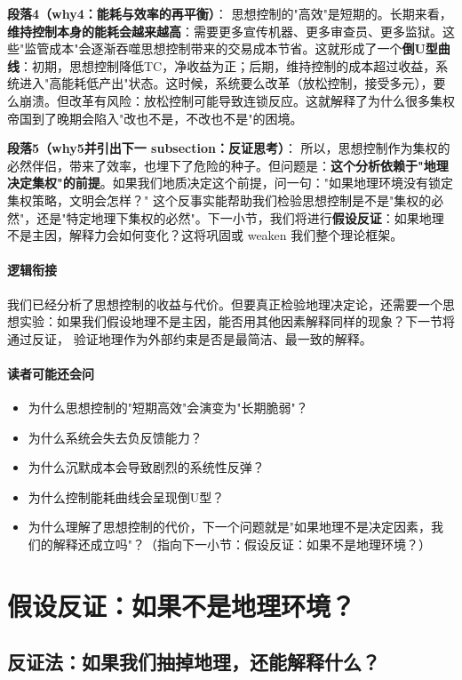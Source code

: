 \documentclass[../main.tex]{subfiles}
\begin{document}
	\textbf{段落4（why4：能耗与效率的再平衡）}：  
	思想控制的"高效"是短期的。长期来看，\textbf{维持控制本身的能耗会越来越高}：需要更多宣传机器、更多审查员、更多监狱。这些"监管成本"会逐渐吞噬思想控制带来的交易成本节省。这就形成了一个\textbf{倒U型曲线}：初期，思想控制降低TC，净收益为正；后期，维持控制的成本超过收益，系统进入"高能耗低产出"状态。这时候，系统要么改革（放松控制，接受多元），要么崩溃。但改革有风险：放松控制可能导致连锁反应。这就解释了为什么很多集权帝国到了晚期会陷入"改也不是，不改也不是"的困境。
	
	\textbf{段落5（why5并引出下一 subsection：反证思考）}：  
	所以，思想控制作为集权的必然伴侣，带来了效率，也埋下了危险的种子。但问题是：\textbf{这个分析依赖于"地理决定集权"的前提}。如果我们地质决定这个前提，问一句："如果地理环境没有锁定集权策略，文明会怎样？" 这个反事实能帮助我们检验思想控制是不是"集权的必然"，还是"特定地理下集权的必然"。下一小节，我们将进行\textbf{假设反证}：如果地理不是主因，解释力会如何变化？这将巩固或 weaken 我们整个理论框架。
	
	\paragraph*{逻辑衔接}
		我们已经分析了思想控制的收益与代价。但要真正检验地理决定论，还需要一个思想实验：如果我们假设地理不是主因，能否用其他因素解释同样的现象？下一节将通过反证，
	验证地理作为外部约束是否是最简洁、最一致的解释。
	
	\paragraph*{读者可能还会问}
	\begin{itemize}
\item 为什么思想控制的"短期高效"会演变为"长期脆弱"？
	\item 为什么系统会失去负反馈能力？
	\item 为什么沉默成本会导致剧烈的系统性反弹？
	\item 为什么控制能耗曲线会呈现倒U型？
	\item 为什么理解了思想控制的代价，下一个问题就是"如果地理不是决定因素，我们的解释还成立吗"？（指向下一小节：假设反证：如果不是地理环境？）
\end{itemize}
	
	\section{假设反证：如果不是地理环境？}

	\subsection{反证法：如果我们抽掉地理，还能解释什么？}
	
\end{document}

